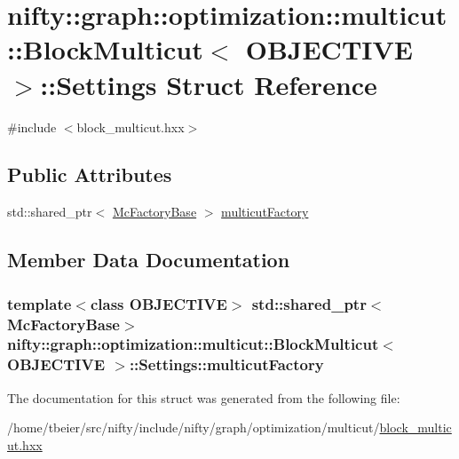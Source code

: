 \hypertarget{structnifty_1_1graph_1_1optimization_1_1multicut_1_1BlockMulticut_1_1Settings}{}\section{nifty\+:\+:graph\+:\+:optimization\+:\+:multicut\+:\+:Block\+Multicut$<$ O\+B\+J\+E\+C\+T\+I\+V\+E $>$\+:\+:Settings Struct Reference}
\label{structnifty_1_1graph_1_1optimization_1_1multicut_1_1BlockMulticut_1_1Settings}


{\ttfamily \#include $<$block\+\_\+multicut.\+hxx$>$}

\subsection*{Public Attributes}
\begin{DoxyCompactItemize}
\item 
std\+::shared\+\_\+ptr$<$ \hyperlink{classnifty_1_1graph_1_1optimization_1_1multicut_1_1BlockMulticut_a568ee0171f58ef95b5b32a4d15aaf2f5}{Mc\+Factory\+Base} $>$ \hyperlink{structnifty_1_1graph_1_1optimization_1_1multicut_1_1BlockMulticut_1_1Settings_a882d75a766524bb995890e331ae2b368}{multicut\+Factory}
\end{DoxyCompactItemize}


\subsection{Member Data Documentation}
\hypertarget{structnifty_1_1graph_1_1optimization_1_1multicut_1_1BlockMulticut_1_1Settings_a882d75a766524bb995890e331ae2b368}{}
\subsubsection[{multicut\+Factory}]{\setlength{\rightskip}{0pt plus 5cm}template$<$class O\+B\+J\+E\+C\+T\+I\+V\+E$>$ std\+::shared\+\_\+ptr$<${\bf Mc\+Factory\+Base}$>$ {\bf nifty\+::graph\+::optimization\+::multicut\+::\+Block\+Multicut}$<$ O\+B\+J\+E\+C\+T\+I\+V\+E $>$\+::Settings\+::multicut\+Factory}\label{structnifty_1_1graph_1_1optimization_1_1multicut_1_1BlockMulticut_1_1Settings_a882d75a766524bb995890e331ae2b368}


The documentation for this struct was generated from the following file\+:\begin{DoxyCompactItemize}
\item 
/home/tbeier/src/nifty/include/nifty/graph/optimization/multicut/\hyperlink{block__multicut_8hxx}{block\+\_\+multicut.\+hxx}\end{DoxyCompactItemize}
